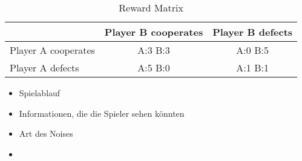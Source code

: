 \documentclass[11pt,twoside]{article}
\begin{document}
\begin{table}[h]

 \begin{center}
\caption{Reward Matrix} \vspace{3mm}
\begin{tabular}{|l|c|c|}

\hline
   & Player B cooperates & Player B defects \\
  \hline
  Player A cooperates & A:3 B:3 & A:0 B:5 \\
 \hline
  Player A defects & A:5 B:0 &A:1 B:1 \\
 \hline
\end{tabular}
 \end{center}
\end{table}


\begin{itemize}
\item Spielablauf
\item Informationen, die die Spieler sehen könnten
\item Art des Noises
\item 
\end{itemize}
\clearpage


\clearpage



\clearpage



\clearpage

\appendix



\end{document}
